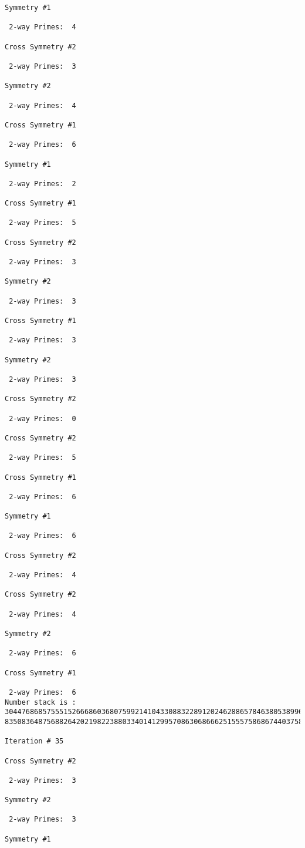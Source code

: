 \begin{verbatim}
Symmetry #1

 2-way Primes: 	4

Cross Symmetry #2

 2-way Primes: 	3

Symmetry #2

 2-way Primes: 	4

Cross Symmetry #1

 2-way Primes: 	6

Symmetry #1

 2-way Primes: 	2

Cross Symmetry #1

 2-way Primes: 	5

Cross Symmetry #2

 2-way Primes: 	3

Symmetry #2

 2-way Primes: 	3

Cross Symmetry #1

 2-way Primes: 	3

Symmetry #2

 2-way Primes: 	3

Cross Symmetry #2

 2-way Primes: 	0

Cross Symmetry #2

 2-way Primes: 	5

Cross Symmetry #1

 2-way Primes: 	6

Symmetry #1

 2-way Primes: 	6

Cross Symmetry #2

 2-way Primes: 	4

Cross Symmetry #2

 2-way Primes: 	4

Symmetry #2

 2-way Primes: 	6

Cross Symmetry #1

 2-way Primes: 	6
Number stack is :
30447686857555152666860368075992141043308832289120246288657846380538996794608835958544046240163340857
83508364875688264202198223880334014129957086306866625155575868674403758043361042640445859538806497699

Iteration #	35

Cross Symmetry #2

 2-way Primes: 	3

Symmetry #2

 2-way Primes: 	3

Symmetry #1


\end{verbatim}
